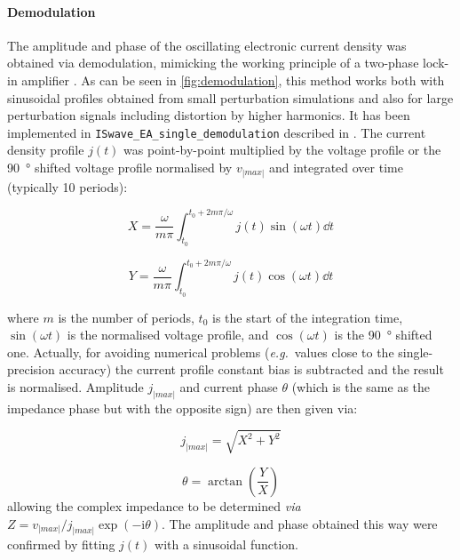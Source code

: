 	\paragraph{Demodulation}
	The amplitude and phase of the oscillating electronic current density was obtained via
	demodulation, mimicking the working principle of a two-phase lock-in amplifier \cite{WikipediaLockIn}.
	As can be seen in \cref{fig:demodulation}, this method works both with sinusoidal profiles obtained from small perturbation simulations and also for large perturbation signals including distortion by higher harmonics.
	It has been implemented in \texttt{IS\-wave\_EA\_single\_demodulation} described in .
	The current density profile $j(t)$ was point-by-point multiplied by the voltage profile or the \SI{90}{\degree} shifted
	voltage profile normalised by $v_|max|$ and integrated over time (typically 10 periods):

	\begin{equation}
		X = \frac{\omega}{m \pi} \int_{t_0}^{t_0+2m\pi / \omega} j(t) \sin(\omega t) \dd t
	\end{equation}

	\begin{equation}
		Y = \frac{\omega}{m \pi} \int_{t_0}^{t_0+2m\pi / \omega} j(t) \cos(\omega t) \dd t
	\end{equation}

	where $m$ is the number of periods, $t_0$ is the start of the integration time, $\sin(\omega t)$ is the normalised voltage profile, and $\cos(\omega t)$ is the \SI{90}{\degree} shifted one.
	Actually, for avoiding numerical problems (\textsl{e.g.}\ values close to the single\hyp{}precision accuracy) the current profile constant bias is subtracted and the result is normalised.
	Amplitude $j_|max|$ and current phase $\theta$ (which is the same as the impedance phase but with the opposite sign) are then given via:

	\begin{equation}
		j_|max| = \sqrt{X^2 + Y^2}
	\end{equation}

	\begin{equation}
		\theta = \arctan(\frac{Y}{X})
	\end{equation}
	allowing the complex impedance to be determined \textsl{via} $Z = v_|max| / j_|max| \exp(-\mathrm{i}\theta)$.
	The amplitude and phase	obtained this way were confirmed by fitting $j(t)$ with a sinusoidal function.


